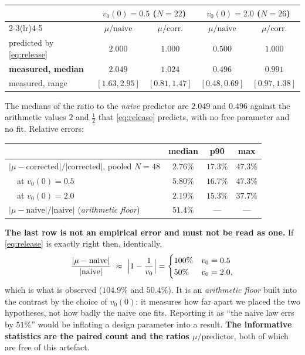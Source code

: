 \begin{center}
\begin{tabular}{@{}lcccc@{}}
\toprule
& \multicolumn{2}{c}{$v_0(0)=0.5$ ($N=22$)} & \multicolumn{2}{c}{$v_0(0)=2.0$ ($N=26$)} \\
\cmidrule(lr){2-3}\cmidrule(lr){4-5}
& $\mu/\text{naive}$ & $\mu/\text{corr.}$ & $\mu/\text{naive}$ & $\mu/\text{corr.}$ \\
\midrule
predicted by \eqref{eq:release} & $2.000$ & $1.000$ & $0.500$ & $1.000$ \\
\textbf{measured, median}       & $\mathbf{2.049}$ & $\mathbf{1.024}$ & $\mathbf{0.496}$ & $\mathbf{0.991}$ \\
measured, range                 & $[1.63,2.95]$ & $[0.81,1.47]$ & $[0.48,0.69]$ & $[0.97,1.38]$ \\
\bottomrule
\end{tabular}
\end{center}

\noindent
The medians of the ratio to the \emph{naive} predictor are $2.049$ and $0.496$
against the arithmetic values $2$ and $\tfrac12$ that \eqref{eq:release}
predicts, with no free parameter and no fit. Relative errors:

\begin{center}
\begin{tabular}{@{}lccc@{}}
\toprule
 & median & p90 & max \\
\midrule
$|\mu-\text{corrected}|/|\text{corrected}|$, pooled $N=48$ & $\mathbf{2.76\%}$ & $17.3\%$ & $47.3\%$ \\
\ \ at $v_0(0)=0.5$ & $5.80\%$ & $16.7\%$ & $47.3\%$ \\
\ \ at $v_0(0)=2.0$ & $2.19\%$ & $15.3\%$ & $37.7\%$ \\
\midrule
$|\mu-\text{naive}|/|\text{naive}|$ (\emph{arithmetic floor}) & $51.4\%$ & --- & --- \\
\bottomrule
\end{tabular}
\end{center}

\noindent
\textbf{The last row is not an empirical error and must not be read as one.} If
\eqref{eq:release} is exactly right then, identically,
\[
\frac{|\mu-\text{naive}|}{|\text{naive}|}
\ \approx\ \Bigl|1-\frac1{v_0}\Bigr|
=\begin{cases}100\% & v_0=0.5\\ 50\% & v_0=2.0,\end{cases}
\]
which is what is observed ($104.9\%$ and $50.4\%$). It is an
\emph{arithmetic floor} built into the contrast by the choice of $v_0(0)$: it
measures how far apart we placed the two hypotheses, not how badly the naive one
fits. Reporting it as ``the naive law errs by $51\%$'' would be inflating a
design parameter into a result. \textbf{The informative statistics are the
paired count and the ratios $\mu/\text{predictor}$}, both of which are free of
this artefact.

